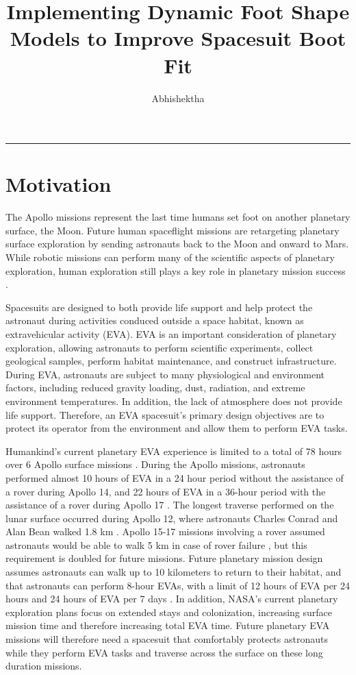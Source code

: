 \documentclass[defaultstyle,11pt]{thesis}
\title{Implementing Dynamic Foot Shape Models to Improve Spacesuit Boot Fit}
\author{Abhishektha}{Boppana}
\begin{document}
\begin{center}\rule{0.5\linewidth}{0.5pt}\end{center}

\hypertarget{chapter:motiv}{%
\chapter{Motivation}\label{chapter:motiv}}

The Apollo missions represent the last time humans set foot on another planetary surface, the Moon.
Future human spaceflight missions are retargeting planetary surface exploration by sending astronauts back to the Moon and onward to Mars.
While robotic missions can perform many of the scientific aspects of planetary exploration, human exploration still plays a key role in planetary mission success \citep{Drake2010}.

Spacesuits are designed to both provide life support and help protect the astronaut during activities conduced outside a space habitat, known as extravehicular activity (EVA).
EVA is an important consideration of planetary exploration, allowing astronauts to perform scientific experiments, collect geological samples, perform habitat maintenance, and construct infrastructure.
During EVA, astronauts are subject to many physiological and environment factors, including reduced gravity loading, dust, radiation, and extreme environment temperatures.
In addition, the lack of atmosphere does not provide life support.
Therefore, an EVA spacesuit's primary design objectives are to protect its operator from the environment and allow them to perform EVA tasks.

Humankind's current planetary EVA experience is limited to a total of 78 hours over 6 Apollo surface missions \citep{Portree1997}.
During the Apollo missions, astronauts performed almost 10 hours of EVA in a 24 hour period without the assistance of a rover during Apollo 14, and 22 hours of EVA in a 36-hour period with the assistance of a rover during Apollo 17 \citep{Portree1997}.
The longest traverse performed on the lunar surface occurred during Apollo 12, where astronauts Charles Conrad and Alan Bean walked 1.8 km \citep{Portree1997}.
Apollo 15-17 missions involving a rover assumed astronauts would be able to walk 5 km in case of rover failure \citep{Portree1997}, but this requirement is doubled for future missions.
Future planetary mission design assumes astronauts can walk up to 10 kilometers to return
to their habitat, and that astronauts can perform 8-hour EVAs, with a limit of 12 hours of EVA per 24 hours and 24 hours of EVA per 7 days \citep{Drake2010}.
In addition, NASA's current planetary exploration plans focus on extended stays and colonization, increasing surface mission time and therefore increasing total EVA time.
Future planetary EVA missions will therefore need a spacesuit that comfortably protects astronauts while they perform EVA tasks and traverse across the surface on these long duration missions.
\end{document}
